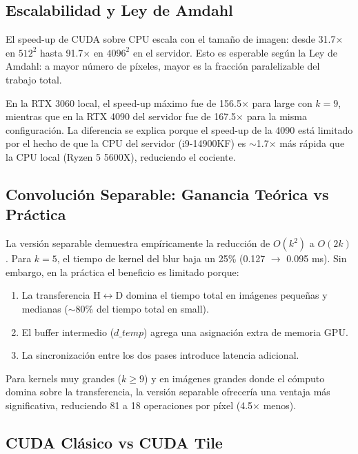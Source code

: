 \documentclass[12pt,a4paper]{article}
\begin{document}
\subsection{Escalabilidad y Ley de Amdahl}

El speed-up de CUDA sobre CPU escala con el tama\~no de imagen: desde 31.7$\times$ en $512^2$ hasta 91.7$\times$ en $4096^2$ en el servidor. Esto es esperable seg\'un la Ley de Amdahl: a mayor n\'umero de p\'ixeles, mayor es la fracci\'on paralelizable del trabajo total.

En la RTX 3060 local, el speed-up m\'aximo fue de 156.5$\times$ para large con $k=9$, mientras que en la RTX 4090 del servidor fue de 167.5$\times$ para la misma configuraci\'on. La diferencia se explica porque el speed-up de la 4090 est\'a limitado por el hecho de que la CPU del servidor (i9-14900KF) es $\sim$1.7$\times$ m\'as r\'apida que la CPU local (Ryzen 5 5600X), reduciendo el cociente.

\subsection{Convoluci\'on Separable: Ganancia Te\'orica vs Pr\'actica}

La versi\'on separable demuestra emp\'iricamente la reducci\'on de $O(k^2)$ a $O(2k)$. Para $k=5$, el tiempo de kernel del blur baja un 25\% (0.127 $\rightarrow$ 0.095 ms). Sin embargo, en la pr\'actica el beneficio es limitado porque:

\begin{enumerate}
  \item La transferencia H$\leftrightarrow$D domina el tiempo total en im\'agenes peque\~nas y medianas ($\sim$80\% del tiempo total en small).
  \item El buffer intermedio ($d\_temp$) agrega una asignaci\'on extra de memoria GPU.
  \item La sincronizaci\'on entre los dos pases introduce latencia adicional.
\end{enumerate}

Para kernels muy grandes ($k \geq 9$) y en im\'agenes grandes donde el c\'omputo domina sobre la transferencia, la versi\'on separable ofrecer\'ia una ventaja m\'as significativa, reduciendo 81 a 18 operaciones por p\'ixel (4.5$\times$ menos).

\subsection{CUDA Cl\'asico vs CUDA Tile}
\end{document}
